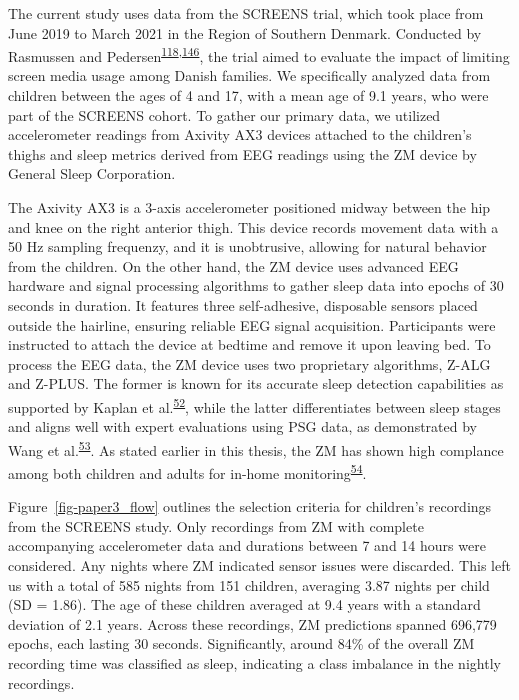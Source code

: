 \documentclass[
  10pt,
]{scrbook}
\begin{document}
The current study uses data from the SCREENS trial, which took place
from June 2019 to March 2021 in the Region of Southern Denmark.
Conducted by Rasmussen and
Pedersen\textsuperscript{\protect\hyperlink{ref-rasmussen_short-term_2020}{118},\protect\hyperlink{ref-pedersen_effects_2022}{146}},
the trial aimed to evaluate the impact of limiting screen media usage
among Danish families. We specifically analyzed data from children
between the ages of 4 and 17, with a mean age of 9.1 years, who were
part of the SCREENS cohort. To gather our primary data, we utilized
accelerometer readings from Axivity AX3 devices attached to the
children's thighs and sleep metrics derived from EEG readings using the
ZM device by General Sleep Corporation.

The Axivity AX3 is a 3-axis accelerometer positioned midway between the
hip and knee on the right anterior thigh. This device records movement
data with a 50 Hz sampling frequenzy, and it is unobtrusive, allowing
for natural behavior from the children. On the other hand, the ZM device
uses advanced EEG hardware and signal processing algorithms to gather
sleep data into epochs of 30 seconds in duration. It features three
self-adhesive, disposable sensors placed outside the hairline, ensuring
reliable EEG signal acquisition. Participants were instructed to attach
the device at bedtime and remove it upon leaving bed. To process the EEG
data, the ZM device uses two proprietary algorithms, Z-ALG and Z-PLUS.
The former is known for its accurate sleep detection capabilities as
supported by Kaplan et
al.\textsuperscript{\protect\hyperlink{ref-kaplan_performance_2014}{52}},
while the latter differentiates between sleep stages and aligns well
with expert evaluations using PSG data, as demonstrated by Wang et
al.\textsuperscript{\protect\hyperlink{ref-wang_evaluation_2015}{53}}.
As stated earlier in this thesis, the ZM has shown high complance among
both children and adults for in-home
monitoring\textsuperscript{\protect\hyperlink{ref-pedersen_self-administered_2021}{54}}.

Figure~\ref{fig-paper3_flow} outlines the selection criteria for
children's recordings from the SCREENS study. Only recordings from ZM
with complete accompanying accelerometer data and durations between 7
and 14 hours were considered. Any nights where ZM indicated sensor
issues were discarded. This left us with a total of 585 nights from 151
children, averaging 3.87 nights per child (SD = 1.86). The age of these
children averaged at 9.4 years with a standard deviation of 2.1 years.
Across these recordings, ZM predictions spanned 696,779 epochs, each
lasting 30 seconds. Significantly, around 84\% of the overall ZM
recording time was classified as sleep, indicating a class imbalance in
the nightly recordings.
\end{document}
